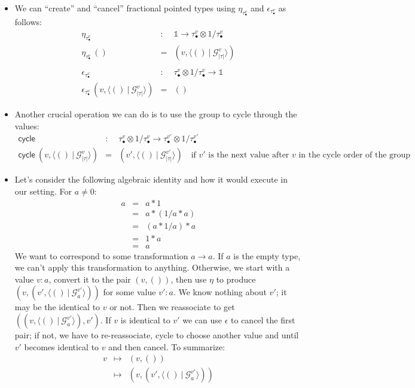 \documentclass{article}
\newcommand{\ot}{\mathbb{1}}
\newcommand{\G}{\mathcal{G}}
\newcommand{\fv}[2]{\langle #1 ~|~ #2 \rangle}
\newcommand{\pt}[2]{#1_{\bullet}^{#2}}
\newcommand{\cycle}{\textsf{cycle}}
\begin{document}
\begin{itemize}
\item We can ``create'' and ``cancel'' fractional pointed types using $\eta_{\pt{\tau}{v}}$ and $\epsilon_{\pt{\tau}{v}}$ as follows: 
\[\begin{array}{rcl}
\eta_{\pt{\tau}{v}} &:& \ot \rightarrow \pt{\tau}{v} \otimes 1/\pt{\tau}{v} \\
\eta_{\pt{\tau}{v}}~() &=& (v , \fv{()}{\G^v_{|\tau|}}) \\
\\
\epsilon_{\pt{\tau}{v}} &:& \pt{\tau}{v} \otimes 1/\pt{\tau}{v} \rightarrow \ot \\
\epsilon_{\pt{\tau}{v}}~(v , \fv{()}{\G^v_{|\tau|}}) &=& () 
\end{array}\]
\item Another crucial operation we can do is to use the group to cycle through the values:
\[\begin{array}{rcl}
\cycle &:& \pt{\tau}{v} \otimes 1/\pt{\tau}{v} \rightarrow \pt{\tau}{v'} \otimes 1/\pt{\tau}{v'} \\
\cycle~(v, \fv{()}{\G^v_{|\tau|}}) &=& (v', \fv{()}{\G^{v'}_{|\tau|}})
  \quad \mbox{if~$v'$~is~the~next~value~after~$v$~in~the~cycle~order~of~the~group}
\end{array}\]
\item Let's consider the following algebraic identity and how it would execute in our setting. For $a \neq 0$:
\[\begin{array}{rcl}
a &=& a * 1 \\
&=& a * (1/a * a) \\
&=& (a * 1/a) * a \\
&=& 1 * a \\
&=& a
\end{array}\]
We want to correspond to some transformation $a \rightarrow a$. If $a$ is the empty type, we can't apply this transformation to anything. Otherwise, we start with a value $v : a$, convert it to the pair $(v, ())$, then use $\eta$ to produce $(v , (v' , \fv{()}{\G_a^{v'}}))$ for some value $v' : a$. We know nothing about $v'$; it may be the identical to $v$ or not. Then we reassociate to get $((v , \fv{()}{\G_a^{v'}}), v')$. If $v$ is identical to $v'$ we can use $\epsilon$ to cancel the first pair; if not, we have to re-reassociate, cycle to choose another value and until $v'$ becomes identical to $v$ and then cancel. To summarize:
\[\begin{array}{rcl}
v &\mapsto& (v , ()) \\
&\mapsto& (v , (v' , \fv{()}{\G_a^{v'}})) \\

\end{array}\]
\end{itemize}
\end{document}

